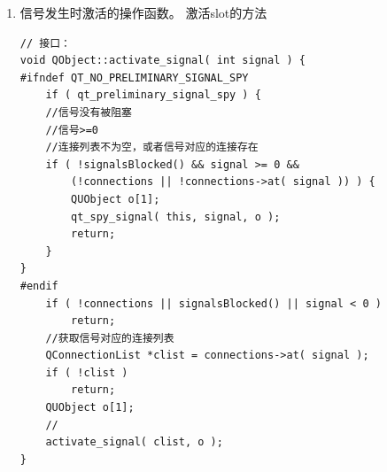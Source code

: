 \documentclass[9pt,b5paper]{article}
\begin{document}
\begin{enumerate}
\begin{lstlisting}
// 二阶段  
// 建立连接  
// (发送信号的对象，信号的索引，接收信号的对象，处理信号的类型，处理信号的索引)  
void QObject::connectInternal( const QObject *sender, int signal_index,   
                               const QObject *receiver, int membcode, int member_index )   {  
    // 发送信号的对象  
    QObject *s = (QObject*)sender;  
    // 接收信号的对象  
    QObject *r = (QObject*)receiver;  
    // 如果发送对象的连接查询表为null，则建立  
    if ( !s->connections ) {                // create connections lookup table  
        s->connections = new QSignalVec( signal_index+1 );  
        Q_CHECK_PTR( s->connections );  
        s->connections->setAutoDelete( true );  
    }  
    // 获取发送对象的相应信号的连接列表  
    QConnectionList *clist = s->connections->at( signal_index );  
    if ( !clist ) {                         // create receiver list  
        clist = new QConnectionList;  
        Q_CHECK_PTR( clist );  
        clist->setAutoDelete( true );  
        s->connections->insert( signal_index, clist );  
    }  
    QMetaObject *rrmeta = r->metaObject();  
    const QMetaData *rm = 0;  
    switch ( membcode ) {                // get receiver member  
    case QSLOT_CODE:  
        rm = rmeta->slot( member_index, true );  
        break;  
    case QSIGNAL_CODE:  
        rm = rmeta->signal( member_index, true );  
        break;  
    }  
    // 建立连接  
    QConnection *c = new QConnection( r, member_index, rm ? rm->name : "qt_invoke", membcode );  
    Q_CHECK_PTR( c );  
    // 把连接添加到发送对象的连接列表中  
    clist->append( c );  
    // 判断接收对象的发送对象列表是否为null  
    if ( !r->senderObjects ) {               // create list of senders 
        // 建立接收对象的发送对象列表  
        r->senderObjects = new QSenderObjectList;  
    }  
    // 把发送对象添加到发送对象列表中  
    r->senderObjects->append( s );           // add sender to list  
}
\end{lstlisting}

\item 信号发生时激活的操作函数。 激活slot的方法
\label{sec-4-2-1-3}
\lstset{language=java,label= ,caption= ,numbers=none}
\begin{lstlisting}
// 接口：
void QObject::activate_signal( int signal ) {  
#ifndef QT_NO_PRELIMINARY_SIGNAL_SPY  
    if ( qt_preliminary_signal_spy ) {  
    //信号没有被阻塞  
    //信号>=0  
    //连接列表不为空，或者信号对应的连接存在  
    if ( !signalsBlocked() && signal >= 0 &&  
        (!connections || !connections->at( signal )) ) {  
        QUObject o[1];  
        qt_spy_signal( this, signal, o );  
        return;  
    }  
}  
#endif  
    if ( !connections || signalsBlocked() || signal < 0 )  
        return;  
    //获取信号对应的连接列表  
    QConnectionList *clist = connections->at( signal );  
    if ( !clist )  
        return;  
    QUObject o[1];  
    //  
    activate_signal( clist, o );  
}  
 

\end{lstlisting}
\end{enumerate}
\end{document}
